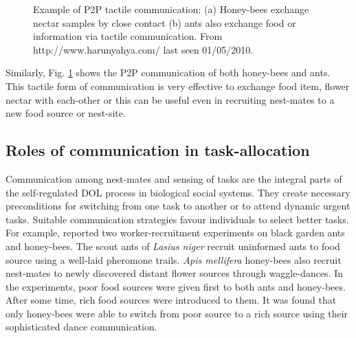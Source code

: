 \begin{figure}[H]
\centering
{} 
\hspace{0.25cm}
\caption{Example of P2P tactile communication: (a) Honey-bees exchange nectar samples by close contact (b) ants also exchange food or information via tactile communication. \protect\newline  From http://www.harunyahya.com/ last seen 01/05/2010.}
\label{fig:bees-ants-p2p-comm}
\end{figure}

Similarly, Fig. \ref{fig:bees-ants-p2p-comm} shows the P2P communication of both honey-bees and ants. This tactile form of communication is very effective to exchange food item, flower nectar with each-other or this can be useful even in recruiting nest-mates to a new food source or nest-site. 
\subsection{Roles of communication in task-allocation}
\label{bg:bio-comm:comm-role}
Communication among nest-mates and sensing of tasks are the integral parts of the self-regulated DOL process in biological social systems. They create necessary  preconditions for switching from one task to another or to attend dynamic urgent tasks. Suitable communication strategies favour individuals to select better tasks. For example,  reported two worker-recruitment experiments on black garden ants and honey-bees. The scout ants of {\em Lasius niger}  recruit uninformed ants to food source using a well-laid pheromone trails. {\em Apis mellifera} honey-bees also recruit nest-mates to newly discovered distant flower sources through waggle-dances. In the experiments,  poor food sources were given first to both ants and honey-bees. After some time,  rich food sources were introduced  to them. It was found that only honey-bees were able to switch from poor source to a rich source using their sophisticated dance communication.


